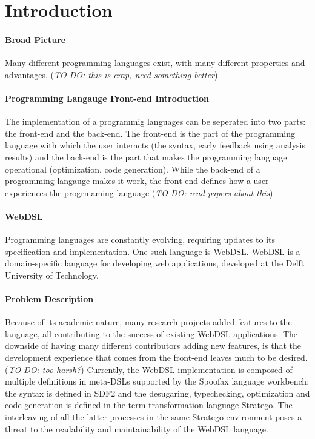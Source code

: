 
\chapter{\label{chap:introduction}Introduction}

  \subsubsection{Broad Picture}
  Many different programming languages exist, with many different properties and advantages. (\emph{TO-DO: this is crap, need something better})

  \subsubsection{Programming Langauge Front-end Introduction}
  The implementation of a programmig languages can be seperated into two parts: the front-end and the back-end. The front-end is the part of the programming language with which the user interacts (the syntax, early feedback using analysis results) and the back-end is the part that makes the programming language operational (optimization, code generation). While the back-end of a programming langauge makes it work, the front-end defines how a user experiences the progrmaming language (\emph{TO-DO: read papers about this}). 

  \subsubsection{WebDSL}
  Programming languages are constantly evolving, requiring updates to its specification and implementation. One such language is WebDSL. WebDSL is a domain-specific language for developing web applications, developed at the Delft University of Technology.

  \subsubsection{Problem Description}
  Because of its academic nature, many research projects added features to the language, all contributing to the success of existing WebDSL applications. The downside of having many different contributors adding new features, is that the development experience that comes from the front-end leaves much to be desired. (\emph{TO-DO: too harsh?}) Currently, the WebDSL implementation is composed of multiple definitions in meta-DSLs supported by the Spoofax language workbench: the syntax is defined in SDF2 and the desugaring, typechecking, optimization and code generation is defined in the term transformation language Stratego. The interleaving of all the latter processes in the same Stratego environment poses a threat to the readability and maintainability of the WebDSL language.
  
